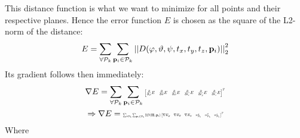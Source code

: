 This distance function is what we want to minimize for all points and their respective planes.
Hence the error function $E$ is chosen as the square of the L2-norm of the distance:
\begin{align}
	E = \sum_{\forall \mathcal{P}_k}\sum_{\vec{p}_i \in \mathcal{P}_k} \norm[2]{D(\varphi,\vartheta,\psi,t_x,t_y,t_z, \vec{p}_i)}^2
\end{align}
Its gradient follows then immediately:
\begin{align}
	&\nabla E =  \sum_{\forall \mathcal{P}_k}\sum_{\vec{p}_i \in \mathcal{P}_k} \resizebox{0.28\textwidth}{!}{$\begin{bmatrix}\pardiff{\varphi} E&\pardiff{\vartheta} E&\pardiff{\psi} E&\pardiff{t_x} E&\pardiff{t_y} E&\pardiff{t_z} E\end{bmatrix}^T$}\\
    &\Rightarrow\nabla E = \resizebox{0.35\textwidth}{!}{$\sum_{\forall \mathcal{P}_k} \sum_{\vec{p}_i\in \mathcal{P}_k}2D(\vec{\Pi}, \vec{p}_i)\begin{bmatrix}\nabla E_\varphi &\nabla E_\vartheta & \nabla E_\psi & n_{\mathcal{P}_k}^x&n_{\mathcal{P}_k}^y&n_{\mathcal{P}_k}^z\end{bmatrix}^T$}
\end{align}
Where
